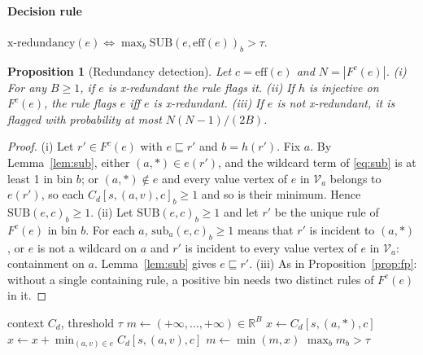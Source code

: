 \documentclass[preprint,12pt]{elsarticle}
\newtheorem{proposition}{Proposition}
\theoremstyle{definition}
\newcommand{\eff}{\mathrm{eff}}
\begin{document}
\paragraph{Decision rule} $\text{x-redundancy}(e)\iff\max_b\mathrm{SUB}(e,\eff(e))_b>\tau$.

\begin{proposition}[Redundancy detection]
\label{thm:red}
Let $c=\eff(e)$ and $N=|F^{c}(e)|$. (i) For any $B\ge1$, if $e$ is x-redundant the rule flags it. (ii) If $h$ is injective on $F^{c}(e)$, the rule flags $e$ iff $e$ is x-redundant. (iii) If $e$ is not x-redundant, it is flagged with probability at most $N(N-1)/(2B)$.
\end{proposition}
\begin{proof}
(i) Let $r'\in F^{c}(e)$ with $e\sqsubseteq r'$ and $b=h(r')$. Fix $a$. By Lemma~\ref{lem:sub}, either $(a,\ast)\in e(r')$, and the wildcard term of \eqref{eq:sub} is at least 1 in bin $b$; or $(a,\ast)\notin e$ and every value vertex of $e$ in $\mathcal{V}_a$ belongs to $e(r')$, so each $C_d[s,(a,v),c]_b\ge1$ and so is their minimum. Hence $\mathrm{SUB}(e,c)_b\ge1$. (ii) Let $\mathrm{SUB}(e,c)_b\ge1$ and let $r'$ be the unique rule of $F^{c}(e)$ in bin $b$. For each $a$, $\mathrm{sub}_a(e,c)_b\ge1$ means that $r'$ is incident to $(a,\ast)$, or $e$ is not a wildcard on $a$ and $r'$ is incident to every value vertex of $e$ in $\mathcal{V}_a$: containment on $a$. Lemma~\ref{lem:sub} gives $e\sqsubseteq r'$. (iii) As in Proposition~\ref{prop:fp}: without a single containing rule, a positive bin needs two distinct rules of $F^c(e)$ in it.
\end{proof}

\begin{algorithm}[t]
\caption{\textsc{DetectRedundancy} at domain $d$ for one own hyperedge $e$ (scope $s$, effect $c$)}
\label{alg:red}
\begin{algorithmic}[1]
\Require context $C_d$, threshold $\tau$
\State $m\gets(+\infty,\dots,+\infty)\in\mathbb{R}^B$
  \State $x\gets C_d[s,(a,\ast),c]$ 
    \State $x\gets x+\min_{(a,v)\in e}C_d[s,(a,v),c]$ 
  \EndIf
  \State $m\gets\min(m,x)$
\EndFor
\State \Return $\max_b m_b>\tau$
\end{algorithmic}
\end{algorithm}
\end{document}
